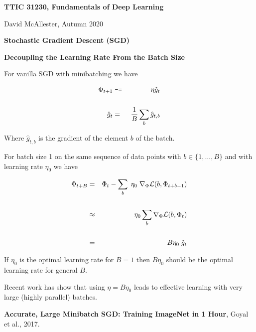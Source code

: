 


\newcommand{\solution}[1]{\bigskip {\bf Solution}: #1}



{\Huge
  \centerline{\bf TTIC 31230, Fundamentals of Deep Learning}
  \bigskip
  \centerline{David McAllester, Autumn 2020}
  \vfill
  \centerline{\bf Stochastic Gradient Descent (SGD)}
  \vfill
  \centerline{\bf Decoupling the Learning Rate From the Batch Size}
  

For vanilla SGD with minibatching we have

\begin{eqnarray*}
\Phi_{t+1} & \;\mbox{\tt -=}\; & \eta \hat{g}_t \\
\\
\hat{g}_t & = & \frac{1}{B} \sum_b \hat{g}_{t,b}
\end{eqnarray*}

\vfill
Where $\hat{g}_{t,b}$ is the gradient of the element $b$ of the batch.


For batch size 1 on the same sequence of data points with $b \in \{1,\ldots,B\}$ and with learning rate $\eta_0$ we have

\begin{eqnarray*}
\Phi_{t+B} & = &  \Phi_{t} - \sum_b \;\eta_0\;\nabla_\Phi {\cal L}(b,\Phi_{t+b-1}) \\
\\
& \approx & \eta_0 \sum_b \nabla_\Phi {\cal L}(b,\Phi_t) \\
\\
& = & B\eta_0\; \hat{g}_t
\end{eqnarray*}

If $\eta_0$ is the optimal learning rate for $B = 1$ then $B\eta_0$ should be the optimal learning rate for general $B$.


Recent work has show that using $\eta = B\eta_0$ leads to effective learning with very large (highly parallel)
batches.

\vfill
{\bf Accurate, Large Minibatch SGD: Training ImageNet in 1 Hour}, Goyal et al., 2017.



} 

